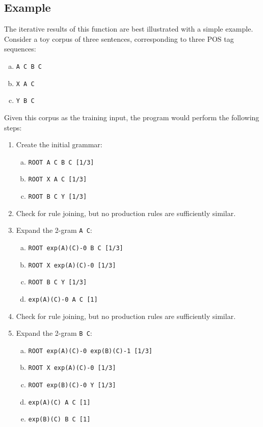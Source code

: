 \documentclass[paper=a4, fontsize=11pt]{scrartcl} %
\numberwithin{equation}{section} %
\numberwithin{figure}{section} %
\numberwithin{table}{section} %
\begin{document}
\subsection{Example}

The iterative results of this function are best illustrated with a simple example. Consider a toy corpus of three sentences, corresponding to three POS tag sequences:

\begin{enumerate}[(a)]
\item \texttt{A C B C}
\item \texttt{X A C}
\item \texttt{Y B C}
\end{enumerate}

Given this corpus as the training input, the program would perform the following steps:
\begin{enumerate}[1.]
\item Create the initial grammar:
\begin{enumerate}[(a)]
\item \texttt{ROOT \textrightarrow A C B C [1/3]}
\item \texttt{ROOT \textrightarrow X A C [1/3]}
\item \texttt{ROOT \textrightarrow B C Y [1/3]}
\end{enumerate}

\item Check for rule joining, but no production rules are sufficiently similar.

\item Expand the 2-gram \texttt{A C}:
\begin{enumerate}[(a)]
\item \texttt{ROOT \textrightarrow exp(A)(C)-0 B C [1/3]}
\item \texttt{ROOT \textrightarrow X exp(A)(C)-0 [1/3]}
\item \texttt{ROOT \textrightarrow B C Y [1/3]}
\item \texttt{exp(A)(C)-0 \textrightarrow A C  [1]}
\end{enumerate}

\item Check for rule joining, but no production rules are sufficiently similar.

\item Expand the 2-gram \texttt{B C}:
\begin{enumerate}[(a)]
\item \texttt{ROOT \textrightarrow exp(A)(C)-0 exp(B)(C)-1 [1/3]}
\item \texttt{ROOT \textrightarrow X exp(A)(C)-0 [1/3]}
\item \texttt{ROOT \textrightarrow exp(B)(C)-0 Y [1/3]}
\item \texttt{exp(A)(C) \textrightarrow A C  [1]}
\item \texttt{exp(B)(C) \textrightarrow B C  [1]}
\end{enumerate}


\end{enumerate}
\end{document}
